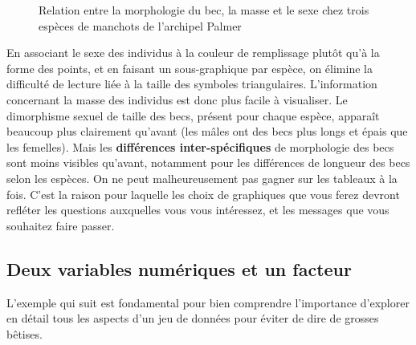 \documentclass[
  a4paper,
  DIV=11,
  numbers=noendperiod,
  oneside]{scrreprt}
\begin{document}
\begin{figure}


\caption{\label{fig-multivar}Relation entre la morphologie du bec, la
masse et le sexe chez trois espèces de manchots de l'archipel Palmer}

\end{figure}%

En associant le sexe des individus à la couleur de remplissage plutôt
qu'à la forme des points, et en faisant un sous-graphique par espèce, on
élimine la difficulté de lecture liée à la taille des symboles
triangulaires. L'information concernant la masse des individus est donc
plus facile à visualiser. Le dimorphisme sexuel de taille des becs,
présent pour chaque espèce, apparaît beaucoup plus clairement qu'avant
(les mâles ont des becs plus longs et épais que les femelles). Mais les
\textbf{différences inter-spécifiques} de morphologie des becs sont
moins visibles qu'avant, notamment pour les différences de longueur des
becs selon les espèces. On ne peut malheureusement pas gagner sur les
tableaux à la fois. C'est la raison pour laquelle les choix de
graphiques que vous ferez devront refléter les questions auxquelles vous
vous intéressez, et les messages que vous souhaitez faire passer.

\subsection{Deux variables numériques et un facteur}\label{sec-simpson}

L'exemple qui suit est fondamental pour bien comprendre l'importance
d'explorer en détail tous les aspects d'un jeu de données pour éviter de
dire de grosses bêtises.
\end{document}
